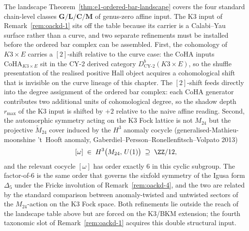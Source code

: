 \begin{remark}
\label{rem:oackd-5}
%
%
%
The landscape Theorem~\ref{thm:e1-ordered-bar-landscape} covers the
four standard chain-level classes $\mathbf{G}/\mathbf{L}/\mathbf{C}/\mathbf{M}$ of
genus-zero affine input. The K3 input of
Remark~\ref{rem:oackd-1} sits off the table because its carrier
is a Calabi--Yau surface rather than a curve, and two separate
refinements must be installed before the ordered bar complex can be
assembled. First, the cohomology of $K3\times E$ carries a
$[2]$-shift relative to the curve case: the CoHA inputs
$\mathrm{CoHA}_{K3\times E}$ sit in the CY-$2$ derived category
$D^b_{\mathrm{CY}\text{-}2}(K3\times E)$, so the shuffle presentation
of the realised positive Hall object acquires a cohomological shift that is
invisible on the curve lineage of this chapter. The $[2]$-shift
feeds directly into the degree assignment of the ordered bar complex:
each CoHA generator contributes two additional units of cohomological
degree, so the shadow depth $r_{\max}$ of the K3 input is shifted by
$+2$ relative to the naive affine reading. Second, the automorphic
symmetry acting on the K3 Fock lattice is not $M_{24}$ but the
projective $\widetilde{M}_{24}$ cover induced by the $H^3$ anomaly
cocycle (generalised-Mathieu-moonshine 't~Hooft anomaly,
Gaberdiel--Persson--Ronellenfitsch--Volpato 2013)
\[
[\omega]
\;\in\;
H^3\bigl(M_{24},\,U(1)\bigr)
\;\supseteq\;
\ZZ/12,
\]
and the relevant cocycle $[\omega]$ has order exactly $6$ in this
cyclic subgroup. The factor-of-$6$ is the same order that governs the
sixfold symmetry of the Igusa form $\Delta_5$ under the Fricke
involution of Remark~\ref{rem:oackd-4}, and the two are related
by the standard comparison between anomaly-twisted and untwisted
sectors of the $M_{24}$-action on the K3 Fock space. Both refinements lie outside the
reach of the landscape table above but are forced on the K3/BKM
extension; the fourth taxonomic slot of
Remark~\ref{rem:oackd-1} acquires this double structural input.
\end{remark}

